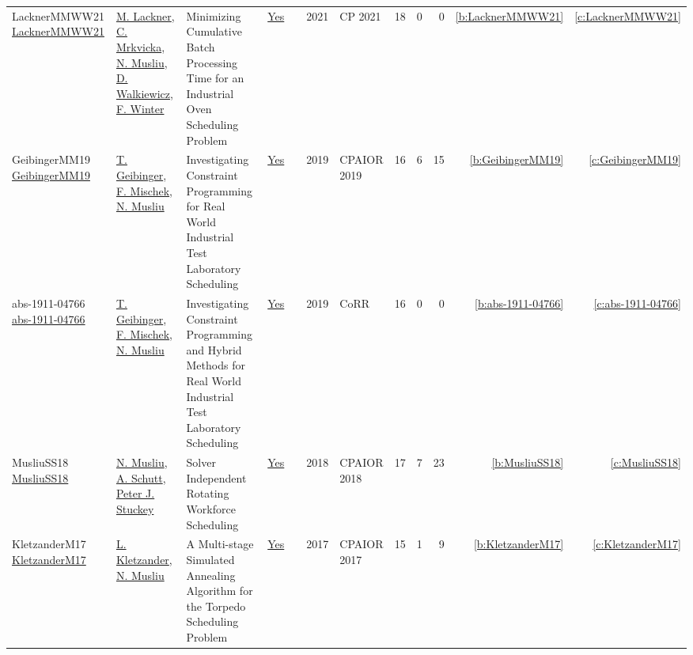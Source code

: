 {\begin{longtable}{>{\raggedright\arraybackslash}p{3cm}>{\raggedright\arraybackslash}p{6cm}>{\raggedright\arraybackslash}p{6.5cm}rrrp{2.5cm}rrrrr}
LacknerMMWW21 \href{https://doi.org/10.4230/LIPIcs.CP.2021.37}{LacknerMMWW21} & \hyperref[auth:a62]{M. Lackner}, \hyperref[auth:a63]{C. Mrkvicka}, \hyperref[auth:a45]{N. Musliu}, \hyperref[auth:a46]{D. Walkiewicz}, \hyperref[auth:a43]{F. Winter} & Minimizing Cumulative Batch Processing Time for an Industrial Oven Scheduling Problem & \href{works/LacknerMMWW21.pdf}{Yes} & \cite{LacknerMMWW21} & 2021 & CP 2021 & 18 & 0 & 0 & \ref{b:LacknerMMWW21} & \ref{c:LacknerMMWW21}\\
GeibingerMM19 \href{https://doi.org/10.1007/978-3-030-19212-9\_20}{GeibingerMM19} & \hyperref[auth:a77]{T. Geibinger}, \hyperref[auth:a80]{F. Mischek}, \hyperref[auth:a45]{N. Musliu} & Investigating Constraint Programming for Real World Industrial Test Laboratory Scheduling & \href{works/GeibingerMM19.pdf}{Yes} & \cite{GeibingerMM19} & 2019 & CPAIOR 2019 & 16 & 6 & 15 & \ref{b:GeibingerMM19} & \ref{c:GeibingerMM19}\\
abs-1911-04766 \href{http://arxiv.org/abs/1911.04766}{abs-1911-04766} & \hyperref[auth:a77]{T. Geibinger}, \hyperref[auth:a80]{F. Mischek}, \hyperref[auth:a45]{N. Musliu} & Investigating Constraint Programming and Hybrid Methods for Real World Industrial Test Laboratory Scheduling & \href{works/abs-1911-04766.pdf}{Yes} & \cite{abs-1911-04766} & 2019 & CoRR & 16 & 0 & 0 & \ref{b:abs-1911-04766} & \ref{c:abs-1911-04766}\\
MusliuSS18 \href{https://doi.org/10.1007/978-3-319-93031-2\_31}{MusliuSS18} & \hyperref[auth:a45]{N. Musliu}, \hyperref[auth:a125]{A. Schutt}, \hyperref[auth:a126]{Peter J. Stuckey} & Solver Independent Rotating Workforce Scheduling & \href{works/MusliuSS18.pdf}{Yes} & \cite{MusliuSS18} & 2018 & CPAIOR 2018 & 17 & 7 & 23 & \ref{b:MusliuSS18} & \ref{c:MusliuSS18}\\
KletzanderM17 \href{https://doi.org/10.1007/978-3-319-59776-8\_28}{KletzanderM17} & \hyperref[auth:a78]{L. Kletzander}, \hyperref[auth:a45]{N. Musliu} & A Multi-stage Simulated Annealing Algorithm for the Torpedo Scheduling Problem & \href{works/KletzanderM17.pdf}{Yes} & \cite{KletzanderM17} & 2017 & CPAIOR 2017 & 15 & 1 & 9 & \ref{b:KletzanderM17} & \ref{c:KletzanderM17}\\
\end{longtable}
}

